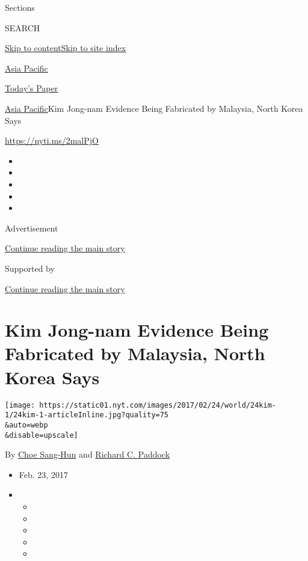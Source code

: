 Sections

SEARCH

\protect\hyperlink{site-content}{Skip to
content}\protect\hyperlink{site-index}{Skip to site index}

\href{https://www.nytimes.com/section/world/asia}{Asia Pacific}

\href{https://myaccount.nytimes.com/auth/login?response_type=cookie\&client_id=vi}{}

\href{https://www.nytimes.com/section/todayspaper}{Today's Paper}

\href{/section/world/asia}{Asia Pacific}\textbar{}Kim Jong-nam Evidence
Being Fabricated by Malaysia, North Korea Says

\url{https://nyti.ms/2malPjO}

\begin{itemize}
\item
\item
\item
\item
\item
\end{itemize}

Advertisement

\protect\hyperlink{after-top}{Continue reading the main story}

Supported by

\protect\hyperlink{after-sponsor}{Continue reading the main story}

\hypertarget{kim-jong-nam-evidence-being-fabricated-by-malaysia-north-korea-says}{%
\section{Kim Jong-nam Evidence Being Fabricated by Malaysia, North Korea
Says}\label{kim-jong-nam-evidence-being-fabricated-by-malaysia-north-korea-says}}

\texttt{[image: https://static01.nyt.com/images/2017/02/24/world/24kim-1/24kim-1-articleInline.jpg?quality=75\\\&auto=webp\\\&disable=upscale]}

By \href{http://www.nytimes.com/by/choe-sang-hun}{Choe Sang-Hun} and
\href{https://www.nytimes.com/by/richard-c-paddock}{Richard C. Paddock}

\begin{itemize}
\item
  Feb. 23, 2017
\item
  \begin{itemize}
  \item
  \item
  \item
  \item
  \item
  \end{itemize}
\end{itemize}

